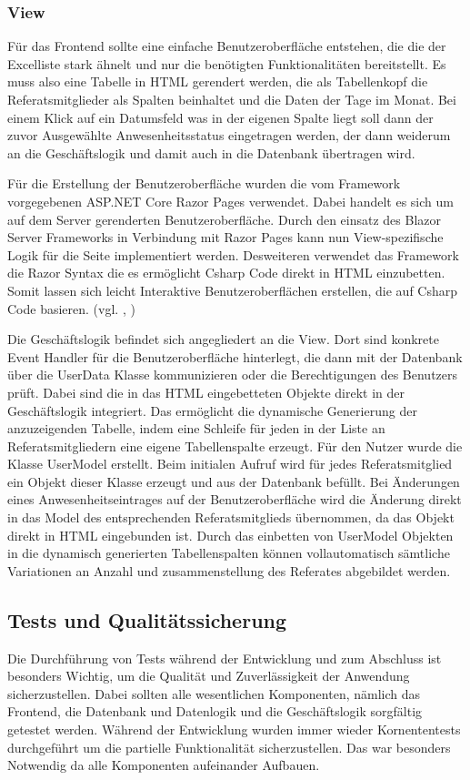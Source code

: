 \subsubsection{View}
\label{sec:View}
Für das Frontend sollte eine einfache Benutzeroberfläche entstehen, die die der Excelliste stark ähnelt und nur die benötigten Funktionalitäten bereitstellt. Es muss also eine Tabelle in HTML gerendert werden, die als Tabellenkopf die Referatsmitglieder als Spalten beinhaltet und die Daten der Tage im Monat. Bei einem Klick auf ein Datumsfeld was in der eigenen Spalte liegt soll dann der zuvor Ausgewählte Anwesenheitsstatus eingetragen werden, der dann weiderum an die Geschäftslogik und damit auch in die Datenbank übertragen wird.

Für die Erstellung der Benutzeroberfläche wurden die vom Framework vorgegebenen ASP.NET Core Razor Pages verwendet. Dabei handelt es sich um auf dem Server gerenderten Benutzeroberfläche. Durch den einsatz des Blazor Server Frameworks in Verbindung mit Razor Pages kann nun View-spezifische Logik für die Seite implementiert werden. Desweiteren verwendet das Framework die Razor Syntax die es ermöglicht Csharp Code direkt in HTML einzubetten. Somit lassen sich leicht Interaktive Benutzeroberflächen erstellen, die auf Csharp Code basieren. (vgl. \cite{Razor}, \cite{RazorSyntax})

Die Geschäftslogik befindet sich angegliedert an die View. Dort sind konkrete Event Handler für die Benutzeroberfläche hinterlegt, die dann \zB mit der Datenbank über die UserData Klasse kommunizieren oder die Berechtigungen des Benutzers prüft. Dabei sind die in das HTML eingebetteten Objekte direkt in der Geschäftslogik integriert. Das ermöglicht die dynamische Generierung der anzuzeigenden Tabelle, indem eine Schleife für jeden in der Liste an Referatsmitgliedern eine eigene Tabellenspalte erzeugt. Für den Nutzer wurde die Klasse UserModel erstellt. Beim initialen Aufruf wird für jedes Referatsmitglied ein Objekt dieser Klasse erzeugt und aus der Datenbank befüllt. Bei Änderungen eines Anwesenheitseintrages auf der Benutzeroberfläche wird die Änderung direkt in das Model des entsprechenden Referatsmitglieds übernommen, da das Objekt direkt in HTML eingebunden ist. Durch das einbetten von UserModel Objekten in die dynamisch generierten Tabellenspalten können vollautomatisch sämtliche Variationen an Anzahl und zusammenstellung des Referates abgebildet werden. %


\subsection{Tests und Qualitätssicherung}
\label{sec:Tests}
Die Durchführung von Tests während der Entwicklung und zum Abschluss ist besonders Wichtig, um die Qualität und Zuverlässigkeit der Anwendung sicherzustellen. Dabei sollten alle wesentlichen Komponenten, nämlich das Frontend, die Datenbank und Datenlogik und die Geschäftslogik sorgfältig getestet werden. Während der Entwicklung wurden immer wieder Kornententests durchgeführt um die partielle Funktionalität sicherzustellen. Das war besonders Notwendig da alle Komponenten aufeinander Aufbauen.

